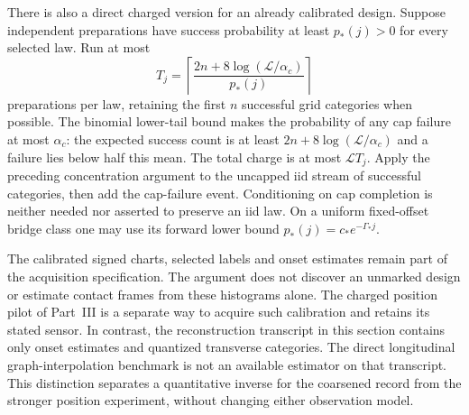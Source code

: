 There is also a direct charged version for an already calibrated design.
Suppose independent preparations have success probability at least
$p_*(j)>0$ for every selected law.  Run at most
\begin{equation}\label{eq:v46-cap}
 T_j=\left\lceil\frac{2n+8\log(\mathcal L/\alpha_c)}{p_*(j)}\right\rceil
\end{equation}
preparations per law, retaining the first $n$ successful grid categories
when possible.  The binomial lower-tail bound makes the probability of
any cap failure at most $\alpha_c$: the expected success count is at least
$2n+8\log(\mathcal L/\alpha_c)$ and a failure lies below half this mean.
The total charge is at most $\mathcal L T_j$.  Apply the preceding
concentration argument to the uncapped iid stream of successful categories,
then add the cap-failure event.  Conditioning on cap completion is neither
needed nor asserted to preserve an iid law.  On a uniform fixed-offset
bridge class one may use its forward lower bound
$p_*(j)=c_*e^{-\Gamma_*j}$.

The calibrated signed charts, selected labels and onset estimates remain
part of the acquisition specification.  The argument does not discover an
unmarked design or estimate contact frames from these histograms alone.
The charged position pilot of Part~III is a separate way to acquire such
calibration and retains its stated sensor.  In contrast, the reconstruction
transcript in this section contains only onset estimates and quantized
transverse categories.  The direct longitudinal graph-interpolation
benchmark is not an available estimator on that transcript.  This distinction
separates a quantitative inverse for the coarsened record from the stronger
position experiment, without changing either observation model.
